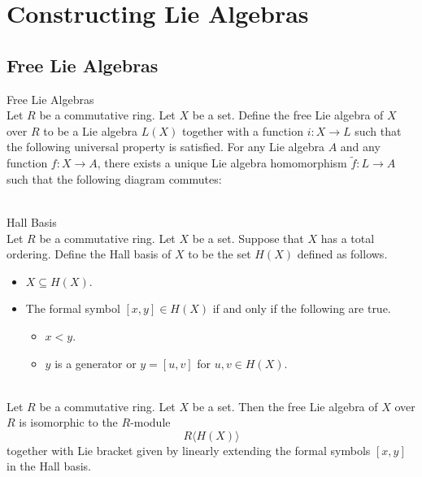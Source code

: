 \documentclass[a4paper]{article}
\begin{document}
\pagebreak
\section{Constructing Lie Algebras}
\subsection{Free Lie Algebras}
\begin{defn}{Free Lie Algebras}{}\\
Let $R$ be a commutative ring. Let $X$ be a set. Define the free Lie algebra of $X$ over $R$ to be a Lie algebra $L(X)$ together with a function $i:X\to L$ such that the following universal property is satisfied. For any Lie algebra $A$ and any function $f:X\to A$, there exists a unique Lie algebra homomorphism $\widetilde{f}:L\to A$ such that the following diagram commutes: \\
\\
\end{defn}

\begin{defn}{Hall Basis}{}\\
Let $R$ be a commutative ring. Let $X$ be a set. Suppose that $X$ has a total ordering. Define the Hall basis of $X$ to be the set $H(X)$ defined as follows. 
\begin{itemize}
\item $X\subseteq H(X)$. 
\item The formal symbol $[x,y]\in H(X)$ if and only if the following are true. 
\begin{itemize}
\item $x<y$. 
\item $y$ is a generator or $y=[u,v]$ for $u,v\in H(X)$. 
\end{itemize}
\end{itemize}
\end{defn}

\begin{prp}{}{}\\
Let $R$ be a commutative ring. Let $X$ be a set. Then the free Lie algebra of $X$ over $R$ is isomorphic to the $R$-module $$R\langle H(X)\rangle$$ together with Lie bracket given by linearly extending the formal symbols $[x,y]$ in the Hall basis. 
\end{prp}
\end{document}
